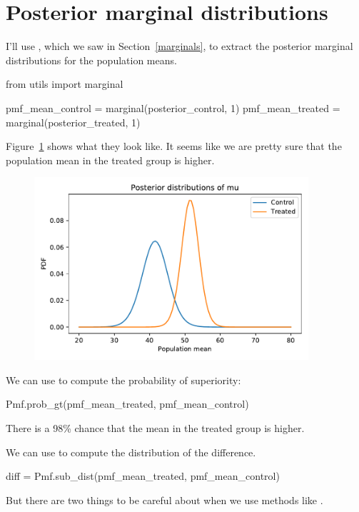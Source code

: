 \documentclass[12pt]{book}
\theoremstyle{exercise}
\begin{document}
\section{Posterior marginal distributions}

I'll use , which we saw in Section~\ref{marginals},
to extract the posterior marginal distributions for the population means.

\begin{code}
from utils import marginal

pmf_mean_control = marginal(posterior_control, 1)
pmf_mean_treated = marginal(posterior_treated, 1)
\end{code}

Figure~\ref{fig11-03} shows what they look like.
It seems like we are pretty sure that the population mean in the treated
group is higher.

\begin{figure}
\centerline{\includegraphics[width=4in]{figs/fig11-03.pdf}}
\caption{}
\label{fig11-03}
\end{figure}

We can use  to
compute the probability of superiority:

\begin{code}
Pmf.prob_gt(pmf_mean_treated, pmf_mean_control)
\end{code}

There is a 98\% chance that the mean in the treated group is higher.

We can use  to compute the
distribution of the difference.

\begin{code}
diff = Pmf.sub_dist(pmf_mean_treated, pmf_mean_control)
\end{code}

But there are two things to be careful about when we use methods like
.
\end{document}
